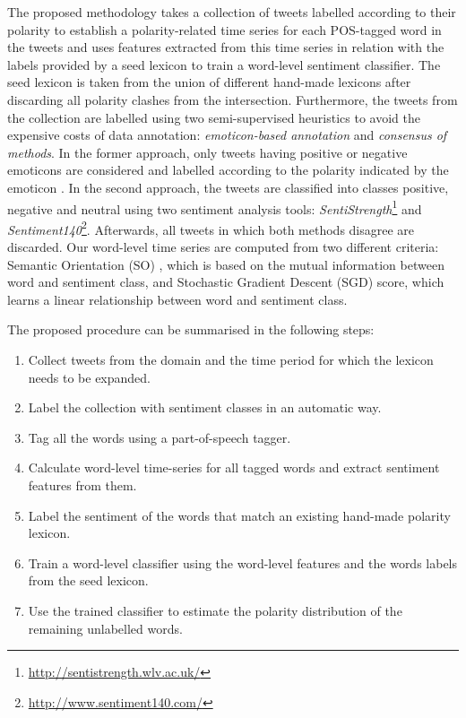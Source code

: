 \documentclass{sig-alternate}
\begin{document}
The proposed methodology takes a collection of tweets labelled according to their polarity to establish a polarity-related time series for each POS-tagged word in the tweets and uses features extracted from this time series in relation with the labels provided by a seed lexicon to train a word-level sentiment classifier. The seed lexicon is taken from the union of different hand-made lexicons after discarding all polarity clashes from the intersection. Furthermore, the tweets from the collection are labelled using two semi-supervised heuristics to avoid the expensive costs of data annotation: \emph{emoticon-based annotation} and \emph{consensus of methods}. In the former approach, only tweets having positive or negative emoticons are considered and labelled according to the polarity indicated by the emoticon \cite{go2010}. In the second approach, the tweets are classified into classes positive, negative and neutral using two sentiment analysis tools: \emph{SentiStrength}\footnote{\url{http://sentistrength.wlv.ac.uk/}} and \emph{Sentiment140}\footnote{\url{http://www.sentiment140.com/}}. Afterwards, all tweets in which both methods disagree are discarded. Our word-level time series are computed from two different criteria: Semantic Orientation (SO) \cite{Turney2002}, which is based on the mutual information between word and sentiment class, and Stochastic Gradient Descent (SGD) score, which learns a linear relationship between word and sentiment class.

The proposed procedure can be summarised in the following steps:

\begin{enumerate}
\item Collect tweets from the domain and the time period for which the lexicon needs to be expanded. 
\item Label the collection with sentiment classes in an automatic way.
\item Tag all the words using a part-of-speech tagger.
\item Calculate word-level time-series for all tagged words and extract sentiment features from them.
\item Label the sentiment of the words that match an existing hand-made polarity lexicon.
\item Train a word-level classifier using the word-level features and the words labels from the seed lexicon.
\item Use the trained classifier to estimate the polarity distribution of the remaining unlabelled words.
\end{enumerate}
 
\end{document}
